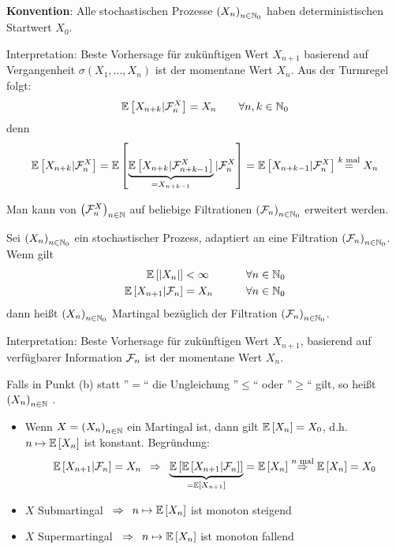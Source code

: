 \textbf{Konvention}: Alle stochastischen Prozesse $\left( X_n \right)_{n \in \mathbb{N}_0}$ haben deterministischen Startwert $X_0$.

Interpretation: Beste Vorhersage für zukünftigen Wert $X_{n+1}$ basierend auf Vergangenheit $\sigma(X_1,\dots,X_n)$ ist der momentane Wert $X_n$.
Aus der Turmregel folgt:
\begin{equation*}
	\EW[X_{n+k}|\F_n^X] = X_n \qquad \forall n,k \in \N_0 %
\end{equation*}
denn
\begin{equation*}
	\mathbb{E} \left[ X_{n+k}|\mathcal{F}_n^X \right] = \mathbb{E} \left[ \underbrace{\mathbb{E} \left[ X_{n+k}|\mathcal{F}_{n+k-1}^X \right]}_{=X_{n+k-1}}|\mathcal{F}_n^X \right] = \mathbb{E} \left[ X_{n+k-1}|\mathcal{F}_n^X \right] \overset{k \text{ mal}}{=} X_n
\end{equation*}

Man kann von $\left( \mathcal{F}_n^X \right)_{n \in \mathbb{N}}$ auf beliebige Filtrationen $\left( \mathcal{F}_n \right)_{n \in \mathbb{N}_0}$ erweitert werden.

\begin{*definition}
	Sei $\left( X_n \right)_{n \in \mathbb{N}_0}$ ein stochastischer Prozess, adaptiert an eine Filtration $\left( \mathcal{F}_n \right)_{n \in \mathbb{N}_0}$. Wenn gilt
	\begin{alignat*}{2}
		\EW[\abs{X_n}] &< \infty \qquad &\forall n \in \N_0 \\ %
		\EW[X_{n+1}|\F_n] &= X_n \qquad &\forall n \in \N_0    %
	\end{alignat*}
	dann heißt $\left( X_n \right)_{n \in \mathbb{N}_0}$ Martingal bezüglich der Filtration $\left( \mathcal{F}_n \right)_{n \in \mathbb{N}_0}$.
\end{*definition}

Interpretation: Beste Vorhersage für zukünftigen Wert $X_{n+1}$, basierend auf verfügbarer Information $\mathcal{F}_n$ ist der momentane Wert $X_n$.

\begin{*definition}
	Falls in Punkt (b) statt ''$=$`` die Ungleichung ''$\le$`` oder ''$\ge$`` gilt, so heißt $\left( X_n \right)_{n \in \mathbb{N}}$ .
\end{*definition}

\begin{itemize}
	\item Wenn $X=\left( X_n \right)_{n \in \mathbb{N}}$ ein Martingal ist, dann gilt $\mathbb{E} \left[ X_n \right] = X_0$, d.h. $n \mapsto \mathbb{E} \left[ X_n \right]$ ist konstant. Begründung:
	\begin{equation*}
	\mathbb{E} \left[ X_{n+1}|\mathcal{F}_n \right] = X_n \enskip \Rightarrow \enskip \underbrace{\mathbb{E} \left[ {\mathbb{E} \left[ X_{n+1}|\mathcal{F}_n \right]} \right]}_{= \mathbb{E} \left[ X_{n+1} \right]} = \mathbb{E} \left[ X_n \right] \overset{n \text{ mal}}{\enskip \Rightarrow \enskip} \mathbb{E} \left[ X_n \right] = X_0
	\end{equation*}
	\item $X$ Submartingal $\enskip \Rightarrow \enskip n \mapsto \mathbb{E} \left[ X_n \right]$ ist monoton steigend
	\item $X$ Supermartingal $\enskip \Rightarrow \enskip n \mapsto \mathbb{E} \left[ X_n \right]$ ist monoton fallend
\end{itemize}

